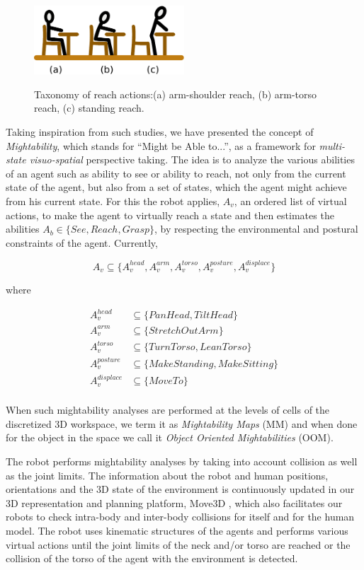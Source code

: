 \documentclass{svmult}
\begin{document}
\begin{figure}
  \centering
  \includegraphics[width=0.5\textwidth]{./figs/reach_postures.pdf} \\
  \caption {Taxonomy of reach actions:(a) arm-shoulder reach, (b) arm-torso 
  reach, (c) standing reach.}
  \label{fig|reaches_taxonomy}
\end{figure}

Taking inspiration from such studies, we have presented the concept of
\emph{Mightability}, which stands for ``Might be Able to...'', as a framework for
\emph{multi-state visuo-spatial} perspective taking. The idea is to analyze the
various abilities of an agent such as ability to see or ability to reach, not
only from the current state of the agent, but also from a set of states, which
the agent might achieve from his current state. For this the robot applies, $A_v$,
an ordered list of virtual actions, to make the agent to virtually reach a state
and then estimates the abilities $A_b \in \{See, Reach, Grasp\}$, by respecting the
environmental and postural constraints of the agent. Currently,

\[ 
A_v \subseteq \{A_v^{head}, A_v^{arm}, A_v^{torso}, A_v^{posture}, A_v^{displace}\}
\]

where

\begin{align*}
A_v^{head} & \subseteq \{PanHead, TiltHead\} \\
A_v^{arm} & \subseteq \{StretchOutArm\} \\
A_v^{torso} & \subseteq \{TurnTorso, LeanTorso\} \\
A_v^{posture} & \subseteq \{MakeStanding, MakeSitting\} \\
A_v^{displace} & \subseteq \{MoveTo\} \\
\end{align*}

When such mightability analyses are performed at the levels of cells of the
discretized 3D workspace, we term it as \emph{Mightability Maps} (MM) and when done
for the object in the space we call it \emph{Object Oriented Mightabilities} (OOM).

The robot performs mightability analyses by taking into account collision
as well as the joint limits. The information about the robot and human
positions, orientations and the 3D state of the environment is continuously
updated in our 3D representation and planning platform, Move3D \cite{Simeon2001}, which
also facilitates our robots to check intra-body and inter-body collisions
for itself and for the human model. The robot uses kinematic structures of
the agents and performs various virtual actions until the joint limits
of the neck and/or torso are reached or the collision of the torso of
the agent with the environment is detected.
\end{document}
